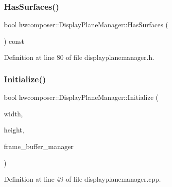 \subsubsection{\texorpdfstring{Has\+Surfaces()}{HasSurfaces()}}
{\footnotesize\ttfamily bool hwcomposer\+::\+Display\+Plane\+Manager\+::\+Has\+Surfaces (\begin{DoxyParamCaption}{ }\end{DoxyParamCaption}) const\hspace{0.3cm}{\ttfamily [inline]}}



Definition at line 80 of file displayplanemanager.\+h.


\begin{DoxyCode}{0}
\end{DoxyCode}
\mbox{\label{classhwcomposer_1_1DisplayPlaneManager_ab1d0c1f3132a46d2ab2ba323a418eebf}} 
\subsubsection{\texorpdfstring{Initialize()}{Initialize()}}
{\footnotesize\ttfamily bool hwcomposer\+::\+Display\+Plane\+Manager\+::\+Initialize (\begin{DoxyParamCaption}\item[{uint32\+\_\+t}]{width,  }\item[{uint32\+\_\+t}]{height,  }\item[{\mbox{\hyperlink{classhwcomposer_1_1FrameBufferManager}{Frame\+Buffer\+Manager}} $\ast$}]{frame\+\_\+buffer\+\_\+manager }\end{DoxyParamCaption})}



Definition at line 49 of file displayplanemanager.\+cpp.


